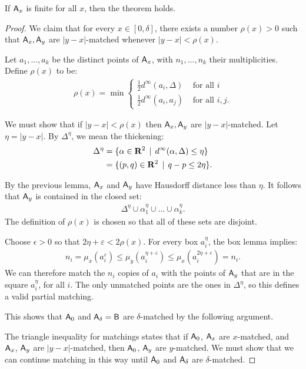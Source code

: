 \begin{lemma}
If $\mathsf{A}_x$ is finite for all $x$, then the theorem holds.
\end{lemma}
\begin{proof}
We claim that for every $x \in [0, \delta]$, there exists a number $\rho(x) > 0$ such that $\mathsf{A}_x, \mathsf{A}_y$ are $|y-x|$-matched whenever $|y - x| < \rho(x)$.

Let $a_1, \dots, a_k$ be the distinct points of $\mathsf{A}_x$, with $n_1, \dots, n_k$ their multiplicities. Define $\rho(x)$ to be:
\begin{align*}
\rho(x) = \min \begin{cases}
\tfrac{1}{2} d^\infty(a_i, \Delta) & \text{ for all } i\\
\tfrac{1}{2} d^\infty(a_i, a_j) & \text{ for all } i, j.
\end{cases}
\end{align*}

We must show that if $|y-x| < \rho(x)$ then $\mathsf{A}_x, \mathsf{A}_y$ are $|y-x|$-matched. Let $\eta = |y-x|$. By $\Delta^\eta$, we mean the thickening:
\begin{align*}
\Delta^\eta &= \{\alpha \in \mathbf{R}^2 \, \mid \, d^\infty(\alpha, \Delta) \leq \eta\} \\
&= \{(p, q) \in \mathbf{R}^2 \, \mid \, q - p \leq 2 \eta\}.
\end{align*}

By the previous lemma, $\mathsf{A}_x$ and $\mathsf{A}_y$ have Hausdorff distance less than $\eta$. It follows that $\mathsf{A}_y$ is contained in the closed set:
\begin{align*}
\Delta^\eta \cup \alpha_1^\eta \cup \dots \cup \alpha_k^\eta.
\end{align*}
The definition of $\rho(x)$ is chosen so that all of these sets are disjoint.

Choose $\epsilon > 0$ so that $2\eta + \varepsilon < 2 \rho(x)$. For every box $a_i^\eta$, the box lemma implies:
\begin{align*}
n_i = \mu_x(a_i^\varepsilon) \leq \mu_y(a_i^{\eta+\varepsilon}) \leq \mu_x(a_i^{2\eta+\varepsilon}) = n_i.
\end{align*}
We can therefore match the $n_i$ copies of $a_i$ with the points of $\mathsf{A}_y$ that are in the square $a_i^\eta$, for all $i$. The only unmatched points are the ones in $\Delta^\eta$, so this defines a valid partial matching.

This shows that $\mathsf{A}_0$ and $\mathsf{A}_\delta = \mathsf{B}$ are $\delta$-matched by the following argument.

The triangle inequality for matchings states that if $\mathsf{A}_0$, $\mathsf{A}_x$ are $x$-matched, and $\mathsf{A}_x$, $\mathsf{A}_y$ are $|y-x|$-matched, then $\mathsf{A}_0$, $\mathsf{A}_y$ are $y$-matched. We must show that we can continue matching in this way until $\mathsf{A}_0$ and $\mathsf{A}_\delta$ are $\delta$-matched.


\end{proof}
